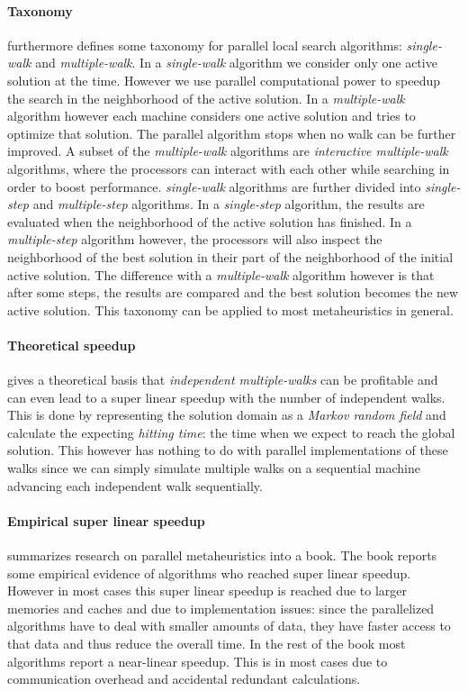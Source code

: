 \documentclass{IEEEconf}
\begin{document}
\paragraph{Taxonomy}\cite{verhoeven1996parallel} furthermore defines some taxonomy for parallel local search algorithms: \emph{single-walk} and \emph{multiple-walk}. In a \emph{single-walk} algorithm we consider only one active solution at the time. However we use parallel computational power to speedup the search in the neighborhood of the active solution. In a \emph{multiple-walk} algorithm however each machine considers one active solution and tries to optimize that solution. The parallel algorithm stops when no walk can be further improved. A subset of the \emph{multiple-walk} algorithms are \emph{interactive multiple-walk} algorithms, where the processors can interact with each other while searching in order to boost performance. \emph{single-walk} algorithms are further divided into \emph{single-step} and \emph{multiple-step} algorithms. In a \emph{single-step} algorithm, the results are evaluated when the neighborhood of the active solution has finished. In a \emph{multiple-step} algorithm however, the processors will also inspect the neighborhood of the best solution in their part of the neighborhood of the initial active solution. The difference with a \emph{multiple-walk} algorithm however is that after some steps, the results are compared and the best solution becomes the new active solution. This taxonomy can be applied to most metaheuristics in general.
\paragraph{Theoretical speedup}
\cite{Shonkwiler94parallelspeed-up} gives a theoretical basis that \emph{independent multiple-walks} can be profitable and can even lead to a super linear speedup with the number of independent walks. This is done by representing the solution domain as a \emph{Markov random field} and calculate the expecting \emph{hitting time}: the time when we expect to reach the global solution. This however has nothing to do with parallel implementations of these walks since we can simply simulate multiple walks on a sequential machine advancing each independent walk sequentially.
\paragraph{Empirical super linear speedup}
\cite{Alba05} summarizes research on parallel metaheuristics into a book. The book reports some empirical evidence of algorithms who reached super linear speedup. However in most cases this super linear speedup is reached due to larger memories and caches and due to implementation issues: since the parallelized algorithms have to deal with smaller amounts of data, they have faster access to that data and thus reduce the overall time. In the rest of the book most algorithms report a near-linear speedup. This is in most cases due to communication overhead and accidental redundant calculations.
\end{document}
